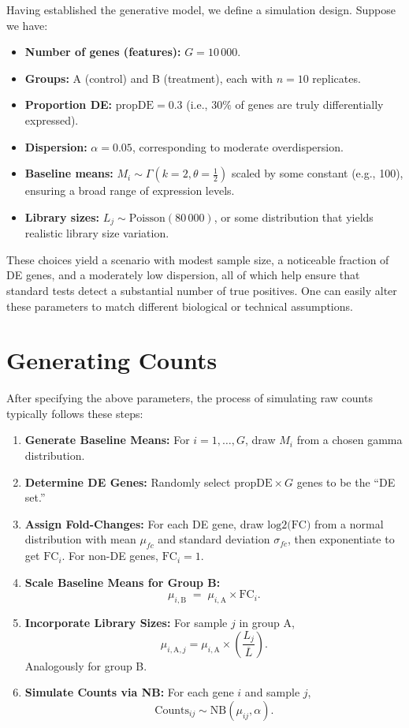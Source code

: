 \documentclass[12pt]{article}
\begin{document}
Having established the generative model, we define a simulation design. Suppose we have:

\begin{itemize}
\item \textbf{Number of genes (features):} $G = 10\,000$.
\item \textbf{Groups:} A (control) and B (treatment), each with $n = 10$ replicates.
\item \textbf{Proportion DE:} $\text{propDE} = 0.3$ (i.e., $30\%$ of genes are truly differentially expressed).
\item \textbf{Dispersion:} $\alpha = 0.05$, corresponding to moderate overdispersion.
\item \textbf{Baseline means:} $M_i \sim \Gamma(k=2, \theta = \frac{1}{2})$ scaled by some constant (e.g., 100), ensuring a broad range of expression levels.
\item \textbf{Library sizes:} $L_j \sim \text{Poisson}(80\,000)$, or some distribution that yields realistic library size variation.
\end{itemize}

These choices yield a scenario with modest sample size, a noticeable fraction of DE genes, and a moderately low dispersion, all of which help ensure that standard tests detect a substantial number of true positives. One can easily alter these parameters to match different biological or technical assumptions.

\section{Generating Counts}
\label{sec:generatingcounts}

After specifying the above parameters, the process of simulating raw counts typically follows these steps:

\begin{enumerate}
\item \textbf{Generate Baseline Means:} For $i=1,\ldots,G$, draw $M_i$ from a chosen gamma distribution. 
\item \textbf{Determine DE Genes:} Randomly select $\text{propDE} \times G$ genes to be the “DE set.” 
\item \textbf{Assign Fold-Changes:} For each DE gene, draw \(\text{log2(FC)}\) from a normal distribution with mean $\mu_{fc}$ and standard deviation $\sigma_{fc}$, then exponentiate to get $\text{FC}_i$. For non-DE genes, $\text{FC}_i = 1$.
\item \textbf{Scale Baseline Means for Group B:} 
\[
\mu_{i,\text{B}} \;=\; \mu_{i,\text{A}} \times \text{FC}_i.
\]
\item \textbf{Incorporate Library Sizes:} For sample $j$ in group A, 
\[
\mu_{i,\text{A},j} = \mu_{i,\text{A}} \times \left(\frac{L_j}{\overline{L}}\right).
\]
Analogously for group B.  
\item \textbf{Simulate Counts via NB:} For each gene $i$ and sample $j$, 
\[
\text{Counts}_{ij} \sim \text{NB}\left(\mu_{ij}, \alpha\right).
\]
\end{enumerate}
\end{document}
